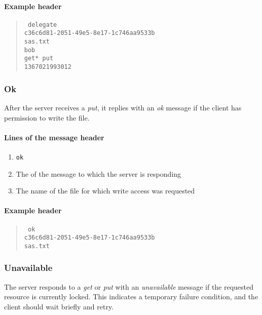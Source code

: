 \documentclass[10pt]{article}
\begin{document}
\paragraph{Example header}
\begin{quote}
\texttt{%
delegate \\
c36c6d81-2051-49e5-8e17-1c746aa9533b \\
sas.txt \\
bob \\
get* put \\
1367021993012
}
\end{quote}

\subsubsection{Ok}

After the server receives a \textit{put}, it replies with an \textit{ok} message if the client
has permission to write the file.

\paragraph{Lines of the message header}
\begin{enumerate}
\item \texttt{ok}
\item The  of the message to which the server is responding
\item The name of the file for which write access was requested
\end{enumerate}

\paragraph{Example header}
\begin{quote}
\texttt{%
ok \\
c36c6d81-2051-49e5-8e17-1c746aa9533b \\
sas.txt
}
\end{quote}

\subsubsection{Unavailable}

The server responds to a \textit{get} or \textit{put} with an \textit{unavailable} message
if the requested resource is currently locked. This indicates a temporary failure condition,
and the client should wait briefly and retry.
\end{document}
